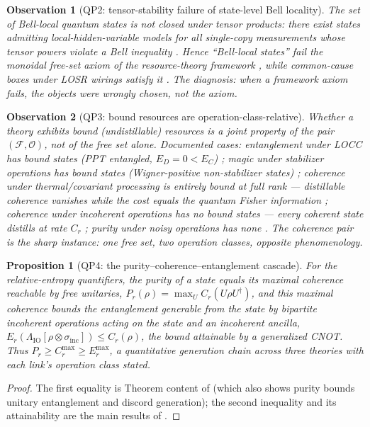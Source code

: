 \documentclass[11pt,a4paper]{article}
\newtheorem{proposition}{Proposition}
\newtheorem{observation}{Observation}
\theoremstyle{definition}
\newcommand{\F}{\mathcal{F}}
\newcommand{\Ops}{\mathcal{O}}
\begin{document}
\begin{observation}[QP2: tensor-stability failure of state-level Bell
locality]\label{obs:qp2}
The set of Bell-local quantum states is not closed under tensor products:
there exist states admitting local-hidden-variable models for all single-copy
measurements whose tensor powers violate a Bell inequality
\cite{palazuelos2012}. Hence ``Bell-local states'' fail the monoidal
free-set axiom of the resource-theory framework \cite{cfs2016}, while
common-cause \emph{boxes} under LOSR wirings satisfy it \cite{wolfe2020}.
The diagnosis: when a framework axiom fails, the objects were wrongly chosen,
not the axiom.
\end{observation}

\begin{observation}[QP3: bound resources are operation-class-relative]
\label{obs:qp3}
Whether a theory exhibits bound (undistillable) resources is a joint property
of the pair $(\F,\Ops)$, not of the free set alone. Documented cases:
entanglement under LOCC has bound states (PPT entangled, $E_D=0<E_C$)
\cite{horodecki2009}; magic under stabilizer operations has bound states
(Wigner-positive non-stabilizer states) \cite{veitch2012}; coherence under
thermal/covariant processing is \emph{entirely} bound at full rank ---
distillable coherence vanishes while the cost equals the quantum Fisher
information \cite{marvian2020}; coherence under incoherent operations has
\emph{no} bound states --- every coherent state distills at rate $C_r$
\cite{winteryang2016}; purity under noisy operations has none
\cite{gour2015}. The coherence pair is the sharp instance: one free set,
two operation classes, opposite phenomenology.
\end{observation}

\begin{proposition}[QP4: the purity--coherence--entanglement cascade]
\label{prop:qp4}
For the relative-entropy quantifiers, the purity of a state equals its
maximal coherence reachable by free unitaries,
$P_r(\rho)=\max_U C_r(U\rho U^\dagger)$, and this maximal coherence bounds
the entanglement generable from the state by bipartite incoherent operations
acting on the state and an incoherent ancilla,
$E_r(\Lambda_{\mathrm{IO}}[\rho\otimes\sigma_{\mathrm{inc}}])\le C_r(\rho)$,
the bound attainable by a generalized CNOT. Thus
$P_r \ge C_r^{\max} \ge E_r^{\max}$, a quantitative generation chain across
three theories with each link's operation class stated.
\end{proposition}
\begin{proof}
The first equality is Theorem content of \cite{streltsov2018njp} (which also
shows purity bounds unitary entanglement and discord generation); the second
inequality and its attainability are the main results of
\cite{streltsov2015}.
\end{proof}
\end{document}

